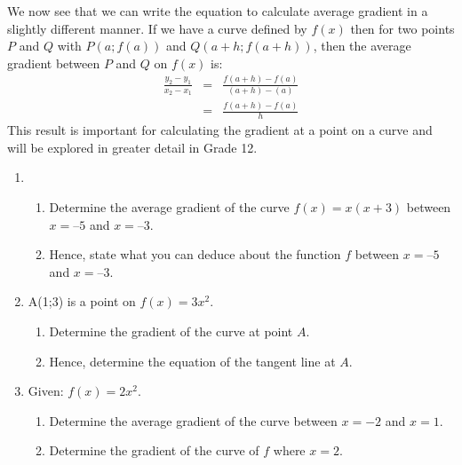 We now see that we can write the equation to calculate average gradient in a slightly different manner. If we have a curve defined by $f(x)$ then for two points $P$ and $Q$ with $P(a;f(a))$ and $Q(a+h;f(a+h))$, then the average gradient between $P$ and $Q$ on $f(x)$ is:
\begin{eqnarray*}
\frac{y_2-y_1}{x_2-x_1}&=&\frac{f(a+h)-f(a)}{(a+h)-(a)}\\
&=&\frac{f(a+h)-f(a)}{h}
\end{eqnarray*}
This result is important for calculating the gradient at a point on a curve and will be explored in greater detail in Grade 12.

\begin{eocexercises}{}
\begin{enumerate}
\item{}
\begin{enumerate}
\item{Determine the average gradient of the curve $f(x) = x(x+3)$ between $x = 5$ and $x = 3$.}
\item{Hence, state what you can deduce about the function $f$ between $x = 5$ and $x = 3$.}
\end{enumerate}
\item{A(1;3) is a point on $f(x)=3x^2$.}{
\begin{enumerate}
\item{Determine the gradient of the curve at point $A$.}
\item{Hence, determine the equation of the tangent line at $A$.}
\end{enumerate}
}
\item{Given: $f(x)=2x^2$.}{
\begin{enumerate}
\item{Determine the average gradient of the curve between $x=-2$ and $x=1$.}
\item{Determine the gradient of the curve of $f$ where $x=2$.}
\end{enumerate}}
\end{enumerate}



\end{eocexercises} 




